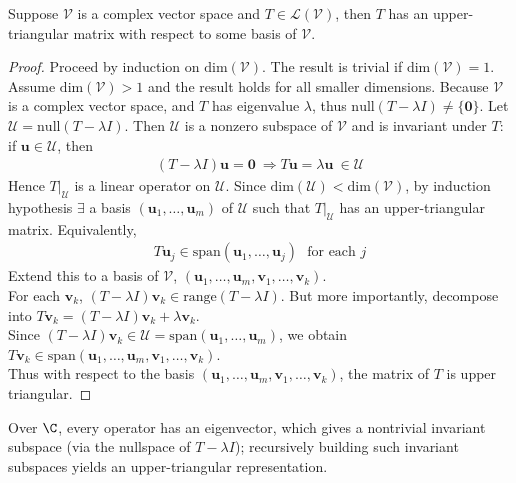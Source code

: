 \begin{theorem} 
\label{thm:schurtriangularisation} Suppose $\mathcal{V}$ is a complex vector space and $T \in \mathcal{L}(\mathcal{V})$, then $T$ has an upper-triangular matrix with respect to some basis of $\mathcal{V}$.
\begin{proof} Proceed by induction on $\text{dim}(\mathcal{V})$. The result is trivial if $\text{dim}(\mathcal{V}) = 1$.\\
Assume $\text{dim}(\mathcal{V}) > 1$ and the result holds for all smaller dimensions. Because $\mathcal{V}$ is a complex vector space, and $T$ has eigenvalue $\lambda$, thus $\text{null}(T - \lambda I) \neq \{ \mathbf{0} \}$. Let $\mathcal{U} = \text{null}(T - \lambda I)$. Then $\mathcal{U}$ is a nonzero subspace of $\mathcal{V}$ and is invariant under $T$: if $\mathbf{u} \in \mathcal{U}$, then
\begin{align}
(T - \lambda I)\mathbf{u} = \mathbf{0} \ \Rightarrow T \mathbf{u} = \lambda \mathbf{u} \ \in \mathcal{U} \nonumber
\end{align}
Hence $T|_{\mathcal{U}}$ is a linear operator on $\mathcal{U}$. Since $\text{dim}(\mathcal{U}) < \text{dim}(\mathcal{V})$, by induction hypothesis $\exists$ a basis $(\mathbf{u}_1, \ldots, \mathbf{u}_m)$ of $\mathcal{U}$ such that $T|_{\mathcal{U}}$ has an upper-triangular matrix. Equivalently,
\begin{align}
T \mathbf{u}_j \in \text{span}(\mathbf{u}_1, \ldots, \mathbf{u}_j) \ \ \ \text{for each } j \nonumber
\end{align}
Extend this to a basis of $\mathcal{V}$, $(\mathbf{u}_1, \ldots, \mathbf{u}_m, \mathbf{v}_1, \ldots, \mathbf{v}_k)$.\\
For each $\mathbf{v}_k$, $(T - \lambda I)\mathbf{v}_k \in \text{range}(T - \lambda I)$. But more importantly, decompose into $T \mathbf{v}_k = (T - \lambda I)\mathbf{v}_k + \lambda \mathbf{v}_k$.\\
Since $(T - \lambda I)\mathbf{v}_k \in \mathcal{U} = \text{span}(\mathbf{u}_1, \ldots, \mathbf{u}_m)$, we obtain $T \mathbf{v}_k \in \text{span}(\mathbf{u}_1, \ldots, \mathbf{u}_m, \mathbf{v}_1, \ldots, \mathbf{v}_k)$.\\
Thus with respect to the basis $(\mathbf{u}_1, \ldots, \mathbf{u}_m, \mathbf{v}_1, \ldots, \mathbf{v}_k)$, the matrix of $T$ is upper triangular.
\end{proof}
\end{theorem}

Over $\C$, every operator has an eigenvector, which gives a nontrivial invariant subspace (via the nullspace of $T - \lambda I$); recursively building such invariant subspaces yields an upper-triangular representation.


